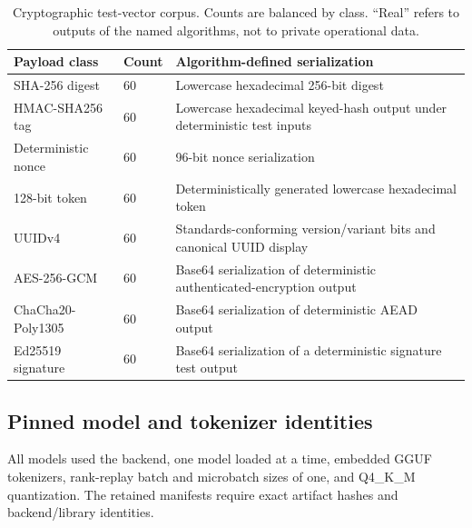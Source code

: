 \documentclass[fleqn,10pt]{wlscirep}
\DeclareRobustCommand{\code}[1]{\path{#1}}
\begin{document}
\begin{table}[H]
\centering
\small
\begin{tabularx}{\textwidth}{L{0.23\textwidth}L{0.13\textwidth}Y}
\toprule
Payload class & Count & Algorithm-defined serialization \\
\midrule
SHA-256 digest & 60 & Lowercase hexadecimal 256-bit digest \\
HMAC-SHA256 tag & 60 & Lowercase hexadecimal keyed-hash output under deterministic test inputs \\
Deterministic nonce & 60 & 96-bit nonce serialization \\
128-bit token & 60 & Deterministically generated lowercase hexadecimal token \\
UUIDv4 & 60 & Standards-conforming version/variant bits and canonical UUID display \\
AES-256-GCM & 60 & Base64 serialization of deterministic authenticated-encryption output \\
ChaCha20-Poly1305 & 60 & Base64 serialization of deterministic AEAD output \\
Ed25519 signature & 60 & Base64 serialization of a deterministic signature test output \\
\bottomrule
\end{tabularx}
\caption{\label{tab:payloads}Cryptographic test-vector corpus. Counts are balanced by class. “Real” refers to outputs of the named algorithms, not to private operational data.}
\end{table}

\subsection*{Pinned model and tokenizer identities}

All models used the \code{llama_cpp} backend, one model loaded at a time, embedded GGUF tokenizers, rank-replay batch and microbatch sizes of one, and Q4\_K\_M quantization. The retained manifests require exact artifact hashes and backend/library identities.
\end{document}
